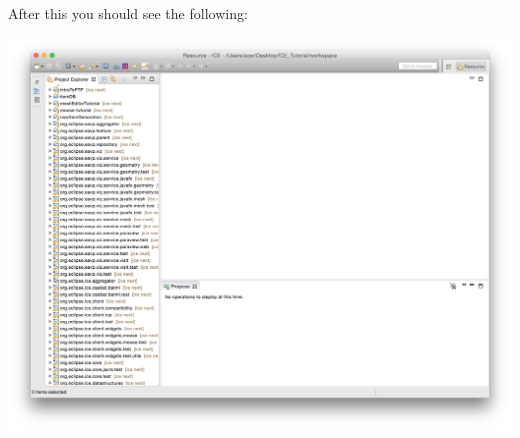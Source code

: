 After this you should see the following:
\begin{center} \includegraphics[width=\textwidth]{figures/cloned} \end{center}
